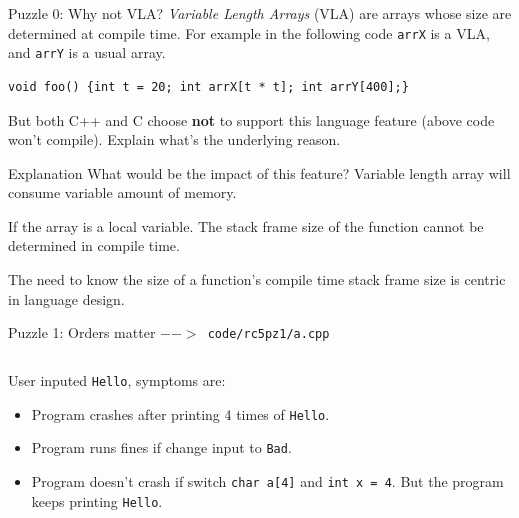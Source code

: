 \begin{frame}[fragile]{Puzzle 0: Why not VLA?}
\textit{Variable Length Arrays} (VLA) are arrays whose size are determined at compile time. For example in the following code \texttt{arrX} is a VLA, and \texttt{arrY} is a usual array.
\begin{verbatim}
void foo() {int t = 20; int arrX[t * t]; int arrY[400];}
\end{verbatim}
But both C++ and C choose \textbf{not} to support this language feature (above code won't compile). Explain what's the underlying reason.

\pause
\begin{block}{Explanation}
What would be the impact of this feature? Variable length array will consume variable amount of memory.

If the array is a local variable. The stack frame size of the function cannot be determined in compile time. 

The need to know the size of a function's compile time stack frame size is centric in language design. 
\end{block}
\end{frame}

\begin{frame}[fragile]{Puzzle 1: Orders matter}
\texttt{$-->$ code/rc5pz1/a.cpp}
\inputminted{c++}{code/rc5pz1/a.cpp}
User inputed \texttt{Hello}, symptoms are:
\begin{itemize}
	\item Program crashes after printing 4 times of \texttt{Hello}.
	\item Program runs fines if change input to \texttt{Bad}.
	\item Program doesn't crash if switch \texttt{char a[4]} and \texttt{int x = 4}. But the program keeps printing \texttt{Hello}.
\end{itemize}
\end{frame}

